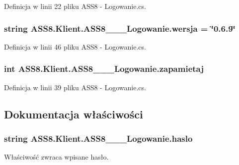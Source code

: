 Definicja w linii 22 pliku ASS8 - Logowanie.cs.\hypertarget{a00001_e61edb6568c06727bbe4d45bf5e51911}{
\subsubsection[{wersja}]{\setlength{\rightskip}{0pt plus 5cm}string {\bf ASS8.Klient.ASS8\_\-\_\-\_\-Logowanie.wersja} = \char`\"{}0.6.9\char`\"{}}}
\label{d8/d84/a00001_e61edb6568c06727bbe4d45bf5e51911}




Definicja w linii 46 pliku ASS8 - Logowanie.cs.\hypertarget{a00001_816b1bd9c5c0ed1776d3a5dc6a0c9f63}{
\subsubsection[{zapamietaj}]{\setlength{\rightskip}{0pt plus 5cm}int {\bf ASS8.Klient.ASS8\_\-\_\-\_\-Logowanie.zapamietaj}}}
\label{d8/d84/a00001_816b1bd9c5c0ed1776d3a5dc6a0c9f63}




Definicja w linii 39 pliku ASS8 - Logowanie.cs.

\subsection{Dokumentacja właściwości}
\hypertarget{a00001_7bd096b1661801146b6ae700f5e11786}{
\subsubsection[{haslo}]{\setlength{\rightskip}{0pt plus 5cm}string ASS8.Klient.ASS8\_\-\_\-\_\-Logowanie.haslo}}
\label{d8/d84/a00001_7bd096b1661801146b6ae700f5e11786}


Właściwość zwraca wpisane hasło. 



